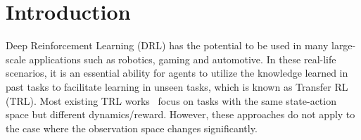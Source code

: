 \section{Introduction}
\label{sec:intro}

Deep Reinforcement Learning (DRL) has the potential to be used in many large-scale applications such as robotics, gaming and automotive.
In these real-life scenarios, it is an essential ability for agents to utilize the knowledge learned in past tasks to facilitate learning in unseen tasks, which is known as Transfer RL (TRL).
Most existing TRL works~\citep{taylor2009transfer,zhu2020transfer} focus on tasks with the same state-action space but different dynamics/reward.
However, these approaches do not apply to the case where the observation space changes significantly. 


